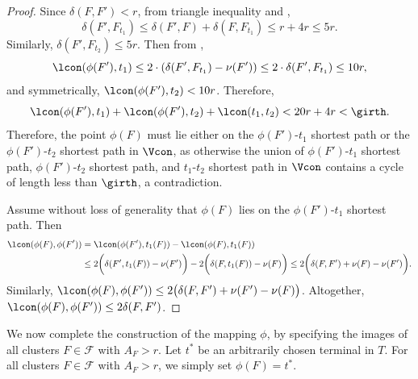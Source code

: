 \documentclass[11pt]{article}
\theoremstyle{definition}
\newcommand{\fset}{{\mathcal{F}}}
\begin{document}
\begin{proof}
Since $\delta(F,F') < r$, from triangle inequality and , 
$$\delta(F',F_{t_1})\le \delta(F',F)+\delta(F,F_{t_1})\le r+4r\le 5r.$$ 
Similarly, $\delta(F',F_{t_2})\le 5r$. 
Then from , 
$$\lcon(\phi(F'),t_1) \le 2\cdot (\delta(F',F_{t_1}) - \nu(F')) \le 2\cdot \delta(F',F_{t_1}) \le  10r,$$ 
and symmetrically, $\lcon(\phi(F'),t_2) < 10r$. Therefore, $$\lcon(\phi(F'),t_1)+\lcon(\phi(F'),t_2)+\lcon(t_1,t_2) < 20r + 4r < \girth.$$
Therefore, the point $\phi(F)$ must lie either on the $\phi(F')$-$t_1$ shortest path or the $\phi(F')$-$t_2$ shortest path in $\Vcon$, as otherwise the union of $\phi(F')$-${t_1}$ shortest path, $\phi(F')$-${t_2}$ shortest path, and $t_1$-${t_2}$ shortest path in $\Vcon$ contains a cycle of length less than $\girth$, a contradiction. 

Assume without loss of generality that $\phi(F)$ lies on the $\phi(F')$-$t_1$ shortest path. Then
\[
\begin{split}
\lcon(\phi(F),\phi(F')) & =\lcon(\phi(F'),t_1(F))-\lcon(\phi(F),t_1(F))\\ 
& \le 2\bigg(\delta(F',t_1(F))-\nu(F')\bigg) - 2\bigg(\delta(F,t_1(F))-\nu(F)\bigg) \le 2\bigg(\delta(F,F')+\nu(F)-\nu(F')\bigg).
\end{split}
\]  
Similarly, $\lcon(\phi(F),\phi(F')) \le 2\big(\delta(F,F')+\nu(F')-\nu(F)\big)$. Altogether, $\lcon(\phi(F),\phi(F')) \le 2\delta(F,F')$.
\end{proof}


We now complete the construction of the mapping $\phi$, by specifying the images of all clusters $F\in \fset$ with $A_F> r$. Let $t^*$ be an arbitrarily chosen terminal in $T$. For all clusters $F\in \fset$ with $A_F > r$, we simply set $\phi(F) = t^*$. 
\end{document}
